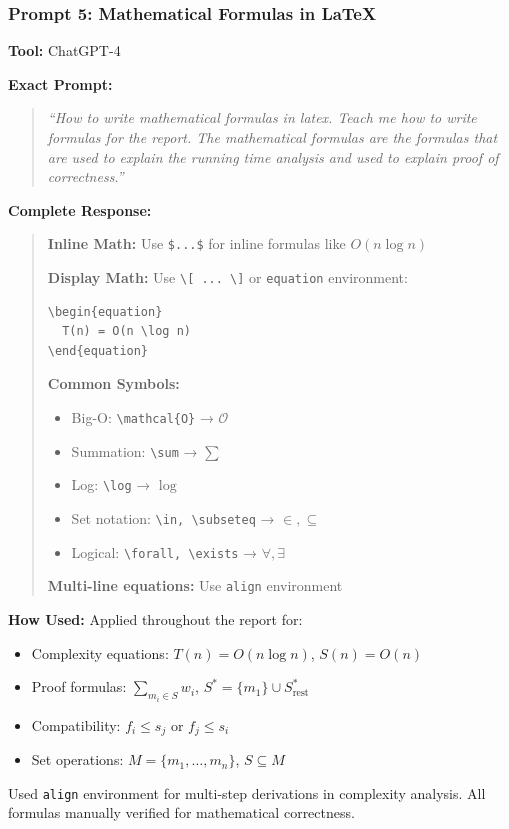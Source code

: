 \documentclass[conference]{IEEEtran}
\begin{document}
\vspace{0.4cm}

\subsubsection{Prompt 5: Mathematical Formulas in LaTeX}
\textbf{Tool:} ChatGPT-4

\textbf{Exact Prompt:}
\begin{quote}
\textit{``How to write mathematical formulas in latex. Teach me how to write formulas for the report. The mathematical formulas are the formulas that are used to explain the running time analysis and used to explain proof of correctness.''}
\end{quote}

\textbf{Complete Response:}
\begin{quote}
\small
\textbf{Inline Math:} Use \texttt{\$...\$} for inline formulas like $O(n \log n)$

\textbf{Display Math:} Use \texttt{\textbackslash[ ... \textbackslash]} or \texttt{equation} environment:
\begin{verbatim}
\begin{equation}
  T(n) = O(n \log n)
\end{equation}
\end{verbatim}

\textbf{Common Symbols:}
\begin{itemize}
    \item Big-O: \texttt{\textbackslash mathcal\{O\}} → $\mathcal{O}$
    \item Summation: \texttt{\textbackslash sum} → $\sum$
    \item Log: \texttt{\textbackslash log} → $\log$
    \item Set notation: \texttt{\textbackslash in, \textbackslash subseteq} → $\in, \subseteq$
    \item Logical: \texttt{\textbackslash forall, \textbackslash exists} → $\forall, \exists$
\end{itemize}

\textbf{Multi-line equations:} Use \texttt{align} environment
\end{quote}

\textbf{How Used:}
Applied throughout the report for:
\begin{itemize}
    \item Complexity equations: $T(n) = O(n \log n)$, $S(n) = O(n)$
    \item Proof formulas: $\sum_{m_i \in S} w_i$, $S^* = \{m_1\} \cup S^*_{\text{rest}}$
    \item Compatibility: $f_i \leq s_j \text{ or } f_j \leq s_i$
    \item Set operations: $M = \{m_1, \ldots, m_n\}$, $S \subseteq M$
\end{itemize}
Used \texttt{align} environment for multi-step derivations in complexity analysis. All formulas manually verified for mathematical correctness.
\end{document}
